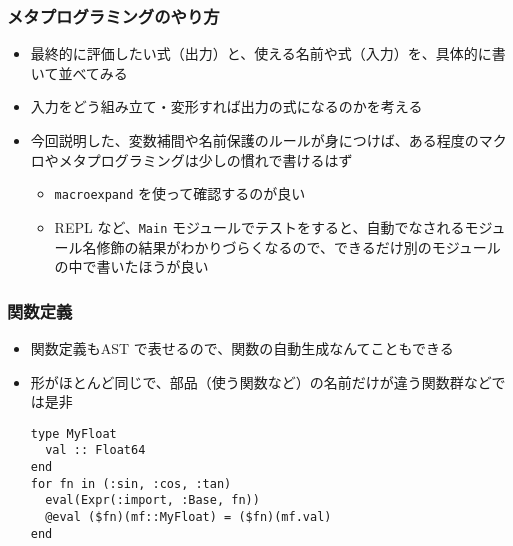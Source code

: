\begin{frame}[containsverbatim]
\frametitle{メタプログラミングのやり方}
\begin{itemize}
  \item 最終的に評価したい式（出力）と、使える名前や式（入力）を、具体的に書いて並べてみる
  \item 入力をどう組み立て・変形すれば出力の式になるのかを考える
  \item 今回説明した、変数補間や名前保護のルールが身につけば、ある程度のマクロやメタプログラミングは少しの慣れで書けるはず
    \begin{itemize}
      \item \verb|macroexpand| を使って確認するのが良い
      \item REPL など、\verb|Main| モジュールでテストをすると、自動でなされるモジュール名修飾の結果がわかりづらくなるので、できるだけ別のモジュールの中で書いたほうが良い
    \end{itemize}
\end{itemize}
\end{frame}

\begin{frame}[containsverbatim]
\frametitle{関数定義}
\begin{itemize}
  \item 関数定義もAST で表せるので、関数の自動生成なんてこともできる
  \item 形がほとんど同じで、部品（使う関数など）の名前だけが違う関数群などでは是非
\begin{lstlisting}
type MyFloat
  val :: Float64
end
for fn in (:sin, :cos, :tan)
  eval(Expr(:import, :Base, fn))
  @eval ($fn)(mf::MyFloat) = ($fn)(mf.val)
end
\end{lstlisting}
\end{itemize}
\end{frame}

